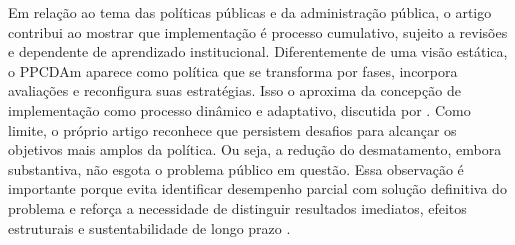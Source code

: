 \documentclass[12pt,a4paper]{article}
\begin{document}
Em relação ao tema das políticas públicas e da administração pública, o artigo contribui ao mostrar que implementação é processo cumulativo, sujeito a revisões e dependente de aprendizado institucional. Diferentemente de uma visão estática, o PPCDAm aparece como política que se transforma por fases, incorpora avaliações e reconfigura suas estratégias. Isso o aproxima da concepção de implementação como processo dinâmico e adaptativo, discutida por \textcite{dascenzi2013_implementacao_de}.
Como limite, o próprio artigo reconhece que persistem desafios para alcançar os objetivos mais amplos da política. Ou seja, a redução do desmatamento, embora substantiva, não esgota o problema público em questão. Essa observação é importante porque evita identificar desempenho parcial com solução definitiva do problema e reforça a necessidade de distinguir resultados imediatos, efeitos estruturais e sustentabilidade de longo prazo \autocite{mello2017_evolucao_do}.
\end{document}
